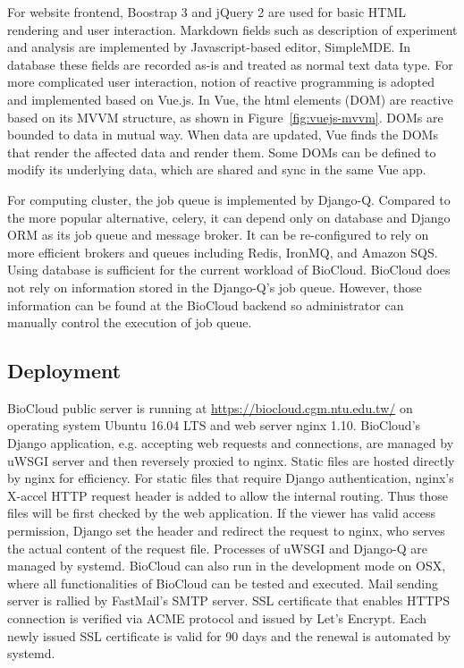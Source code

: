 For website frontend, Boostrap 3 and jQuery 2 are used for basic HTML
rendering and user interaction. Markdown fields such as description of
experiment and analysis are implemented by Javascript-based editor, SimpleMDE.
In database these fields are recorded as-is and treated as normal text
data type. For more complicated user interaction, notion of reactive
programming is adopted and implemented based on Vue.js. In Vue, the html
elements (DOM) are reactive based on its MVVM structure, as shown in
Figure~\ref{fig:vuejs-mvvm}. DOMs are bounded to data in mutual way. When data
are updated, Vue finds the DOMs that render the affected data and render
them. Some DOMs can be defined to modify its underlying data, which are shared
and sync in the same Vue app.



For computing cluster, the job queue is implemented by Django-Q. Compared to
the more popular alternative, celery, it can depend only on database and Django
ORM as its job queue and message broker. It can be re-configured to rely on
more efficient brokers and queues including Redis, IronMQ, and Amazon SQS.
Using database is sufficient for the current workload of BioCloud. BioCloud
does not rely on information stored in the Django-Q's job queue. However, those
information can be found at the BioCloud backend so administrator can manually
control the execution of job queue.


\subsection{Deployment}


BioCloud public server is running at \url{https://biocloud.cgm.ntu.edu.tw/} on
operating system Ubuntu 16.04 LTS and web server nginx 1.10. BioCloud's Django
application, e.g. accepting web requests and connections, are managed by uWSGI
server and then reversely proxied to nginx. Static files are hosted directly by
nginx for efficiency. For static files that require Django authentication,
nginx's X-accel HTTP request header is added to allow the internal routing.
Thus those files will be first checked by the web application. If the viewer
has valid access permission, Django set the header and redirect the request to
nginx, who serves the actual content of the request file. Processes of uWSGI
and Django-Q are managed by systemd. BioCloud can also run in the development
mode on OSX, where all functionalities of BioCloud can be tested and executed.
Mail sending server is rallied by FastMail's SMTP server. SSL certificate that
enables HTTPS connection is verified via ACME protocol and issued by Let's
Encrypt. Each newly issued SSL certificate is valid for 90 days and the renewal
is automated by systemd.


